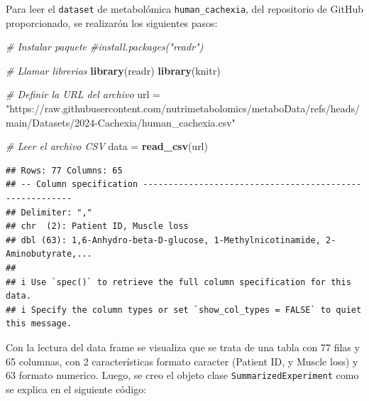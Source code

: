 \documentclass[
]{article}
\newenvironment{Shaded}{\begin{snugshade}}{\end{snugshade}}
\newcommand{\CommentTok}[1]{\textcolor[rgb]{0.56,0.35,0.01}{\textit{#1}}}
\newcommand{\FunctionTok}[1]{\textcolor[rgb]{0.13,0.29,0.53}{\textbf{#1}}}
\newcommand{\NormalTok}[1]{#1}
\newcommand{\OtherTok}[1]{\textcolor[rgb]{0.56,0.35,0.01}{#1}}
\newcommand{\StringTok}[1]{\textcolor[rgb]{0.31,0.60,0.02}{#1}}
\begin{document}
Para leer el \texttt{dataset} de metabolómica \texttt{human\_cachexia},
del repositorio de GitHub proporcionado, se realizarón los siguientes
pasos:

\begin{Shaded}
\begin{Highlighting}[]
\CommentTok{\# Instalar paquete}
\CommentTok{\#install.packages("readr")}

\CommentTok{\# Llamar librerias}
\FunctionTok{library}\NormalTok{(readr)}
\FunctionTok{library}\NormalTok{(knitr)}

\CommentTok{\# Definir la URL del archivo}
\NormalTok{url }\OtherTok{=} \StringTok{"https://raw.githubusercontent.com/nutrimetabolomics/metaboData/refs/heads/main/Datasets/2024{-}Cachexia/human\_cachexia.csv"}

\CommentTok{\# Leer el archivo CSV}
\NormalTok{data }\OtherTok{=} \FunctionTok{read\_csv}\NormalTok{(url)}
\end{Highlighting}
\end{Shaded}

\begin{verbatim}
## Rows: 77 Columns: 65
## -- Column specification --------------------------------------------------------
## Delimiter: ","
## chr  (2): Patient ID, Muscle loss
## dbl (63): 1,6-Anhydro-beta-D-glucose, 1-Methylnicotinamide, 2-Aminobutyrate,...
## 
## i Use `spec()` to retrieve the full column specification for this data.
## i Specify the column types or set `show_col_types = FALSE` to quiet this message.
\end{verbatim}

Con la lectura del data frame se visualiza que se trata de una tabla con
77 filas y 65 columnas, con 2 características formato caracter (Patient
ID, y Muscle loss) y 63 formato numerico. Luego, se creo el objeto clase
\texttt{SummarizedExperiment} como se explica en el siguiente código:
\end{document}
